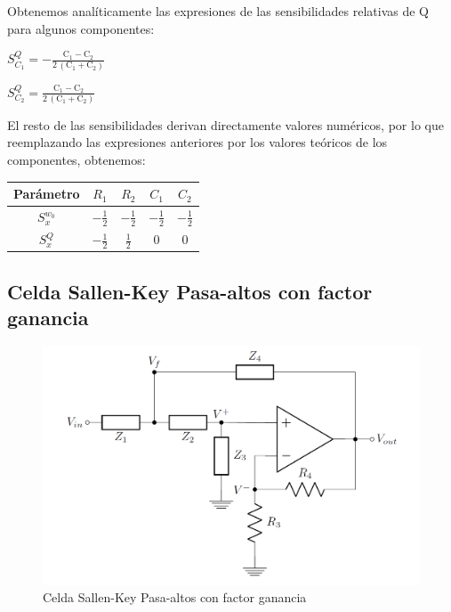 \documentclass[../tc_tpfinal_main.tex]{subfiles}
\begin{document}
Obtenemos analíticamente las expresiones de las sensibilidades relativas de Q para algunos componentes: \par
$S^{Q}_{C_1} =-\frac{\mathrm{C_1} - \mathrm{C_2}}{2\, \left(\mathrm{C_1} + \mathrm{C_2}\right)}$ \par
$S^{Q}_{C_2} = \frac{\mathrm{C_1} - \mathrm{C_2}}{2\, \left(\mathrm{C_1} + \mathrm{C_2}\right)}$ \par 
El resto de las sensibilidades derivan directamente valores numéricos, por lo que reemplazando las expresiones anteriores por los valores teóricos de los componentes, obtenemos:\par
 	\begin{table}[H] 
				\centering
 				\begin{tabular}{||c c c c c||} 
 					\hline
				  Parámetro& $R_1$ & $R_2$&$C_1$&$C_2$\\ [0.5ex] 
 					\hline\hline
					 $S^{w_0}_x$& $- \frac{1}{2}$ &$- \frac{1}{2}$&$- \frac{1}{2}$&$- \frac{1}{2}$\\
					 $S^{Q}_x$&$- \frac{1}{2}$ &$\frac{1}{2}$&0&0\\[1ex] 
					\hline
				\end{tabular}
			\end{table}
\subsection{Celda Sallen-Key Pasa-altos con factor ganancia}
\begin{figure}[H]	
	\centering
	\includegraphics[scale=0.5]{imagenes/sallen_key_gain_circ.png}
	\caption{Celda Sallen-Key Pasa-altos con factor ganancia}
	\label{fig:tpfinal_sallen_key_gain_circ}
\end{figure}
\end{document}
